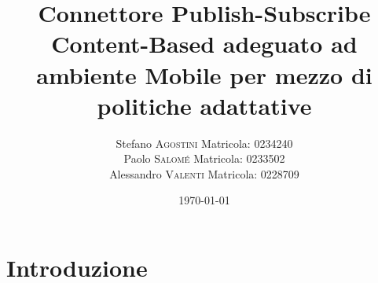 \documentclass{article}
\title{Connettore Publish-Subscribe Content-Based adeguato ad ambiente Mobile per mezzo di politiche adattative } %
\author{Stefano \textsc{Agostini} Matricola: 0234240 \\ Paolo \textsc{Salom\'e} Matricola: 0233502 \\ Alessandro \textsc{Valenti} Matricola: 0228709} %
\date{\today} %
\begin{document}
\maketitle %




\section{Introduzione}
\end{document}
